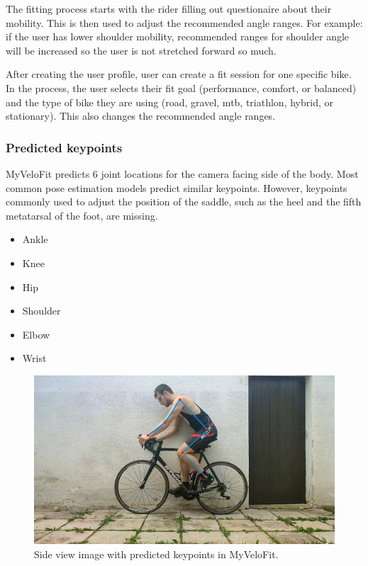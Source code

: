 The fitting process starts with the rider filling out questionaire about their mobility. This is then used to adjust the recommended angle ranges. For example: if the user has lower shoulder mobility, recommended ranges for shoulder angle will be increased so the user is not stretched forward so much.

After creating the user profile, user can create a fit session for one specific bike. In the process, the user selects their fit goal (performance, comfort, or balanced) and the type of bike they are using (road, gravel, mtb, triathlon, hybrid, or stationary). This also changes the recommended angle ranges.

\subsubsection{Predicted keypoints}
MyVeloFit predicts 6 joint locations for the camera facing side of the body. Most common pose estimation models predict similar keypoints. However, keypoints commonly used to adjust the position of the saddle, such as the heel and the fifth metatarsal of the foot, are missing.


\begin{itemize}
    \item Ankle
    \item Knee
    \item Hip
    \item Shoulder
    \item Elbow
    \item Wrist
\end{itemize}

\begin{figure}[htbp]
    \centering
    \includegraphics[width=\textwidth]{obrazky-figures/myvelofit_keypoints.png}
    \caption{Side view image with predicted keypoints in MyVeloFit.}
    \label{fig:myvelofit_keypoints}
\end{figure}

